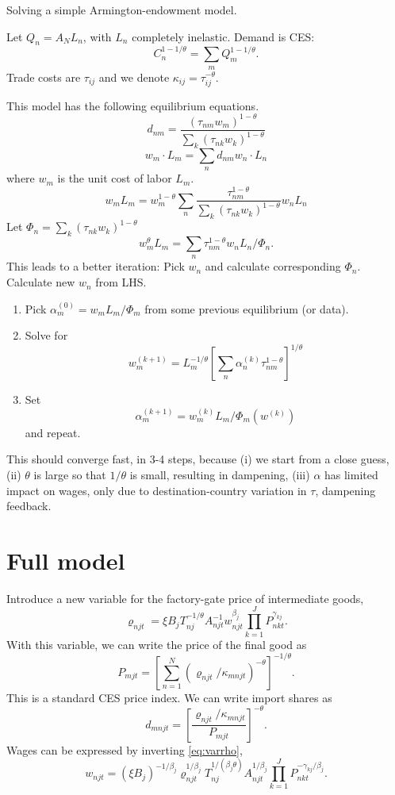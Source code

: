 \documentclass[12pt]{article}
\begin{document}
Solving a simple Armington-endowment model.

Let $Q_n = A_NL_n$, with $L_n$ completely inelastic. Demand is CES:
\[
C_n^{1-1/\theta} = \sum_m Q_m^{1-1/\theta}.
\]
Trade costs are $\tau_{ij}$ and we denote $\kappa_{ij} = \tau_{ij}^{-\theta}$.

This model has the following equilibrium equations.
\[
d_{nm} = 
	\frac
	{(\tau_{nm}w_m)^{1-\theta}}
	{\sum_k (\tau_{nk} w_k)^{1-\theta}}
\]
\[
w_m \cdot L_m = \sum_n d_{nm} w_n \cdot L_n
\]
where $w_m$ is the unit cost of labor $L_m$.
\[
w_m L_m = w_m^{1-\theta}
\sum_n 	\frac
	{\tau_{nm}^{1-\theta}}
	{\sum_k (\tau_{nk} w_k)^{1-\theta}}
 w_n L_n
\]
Let $\Phi_n = \sum_k (\tau_{nk} w_k)^{1-\theta}$ 
\[
w_m^\theta L_m = 
\sum_n 	
	{\tau_{nm}^{1-\theta}}
 w_n L_n/\Phi_n.
\]
This leads to a better iteration: Pick $w_n$ and calculate corresponding $\Phi_n$. Calculate new $w_n$ from LHS. 

\begin{enumerate}
	\item Pick $\alpha_m^{(0)} = w_mL_m/\Phi_m$ from some previous equilibrium (or data).
	\item Solve for
	\[
	w_m^{(k+1)} = L_m^{-1/\theta} 
		\left[
		\sum_n \alpha_n^{(k)} \tau_{nm}^{1-\theta}
		\right]^{1/\theta}
	\]
	\item Set 
	\[
	\alpha_m^{(k+1)} = w_m^{(k)} L_m/\Phi_m(w^{(k)})
	\]
	and repeat.
\end{enumerate}
This should converge fast, in 3-4 steps, because (i) we start from a close guess, (ii) $\theta$ is large so that $1/\theta$ is small, resulting in dampening, (iii) $\alpha$ has limited impact on wages, only due to destination-country variation in $\tau$, dampening feedback.

\section{Full model}
Introduce a new variable for the factory-gate price of intermediate goods,
\begin{equation}\label{eq:varrho}
	\varrho_{njt} = \xi B_j T_{nj}^{-1/\theta} A_{njt}^{-1} w_{njt}^{\beta_j} \prod_{k=1}^J P_{nkt}^{\gamma_{kj}}.
\end{equation}
With this variable, we can write the price of the final good as
\begin{equation}\label{eq:price}
	P_{mjt} = \left[
		\sum_{n=1}^N (\varrho_{njt}/\kappa_{mnjt})^{-\theta}
		\right]^{-1/\theta}.
\end{equation}
This is a standard CES price index. We can write import shares as
\begin{equation}\label{eq:import_share}
	d_{mnjt} = \left[
	\frac
	{\varrho_{njt}/\kappa_{mnjt}}
	{P_{mjt}}
	\right]^{-\theta}.
\end{equation}
Wages can be expressed by inverting \eqref{eq:varrho},
\begin{equation}\label{eq:wage}
	w_{njt} = (\xi B_j)^{-1/\beta_j}
	\varrho_{njt}^{1/\beta_j}  
	T_{nj}^{1/(\beta_j\theta)}A_{njt}^{1/\beta_j} 
	\prod_{k=1}^J P_{nkt}^{-\gamma_{kj}/\beta_j}.
\end{equation}
\end{document}
